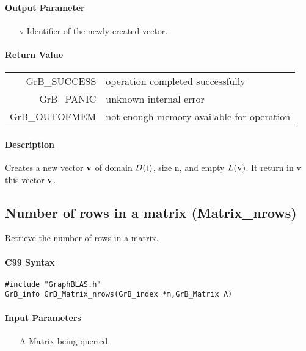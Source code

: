 \documentclass[11pt]{extarticle}
\begin{document}
\paragraph{Output Parameter}

\begin{itemize}
	\item[{\sf v}] Identifier of the newly created vector.
\end{itemize}

\paragraph{Return Value}

\begin{tabular}{rl} 
{\sf GrB\_SUCCESS} 	& operation completed successfully \\
{\sf GrB\_PANIC}	& unknown internal error \\
{\sf GrB\_OUTOFMEM}	& not enough memory available for operation \\
\end{tabular}

\paragraph{Description}

Creates a new vector ${\bf v}$ of domain $D({\sf t})$, size {\sf n}, and
empty $L({\bf v})$. It return in {\sf v} this vector ${\bf v}$.

\subsection{Number of rows in a matrix ({\sf Matrix\_nrows})}

Retrieve the number of rows in a matrix.

\paragraph{C99 Syntax}

\begin{verbatim}
#include "GraphBLAS.h"
GrB_info GrB_Matrix_nrows(GrB_index *m,GrB_Matrix A)
\end{verbatim}

\paragraph{Input Parameters}

\begin{itemize}
	\item[{\sf A}] Matrix being queried.
\end{itemize}
\end{document}
